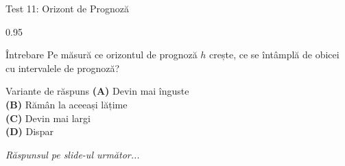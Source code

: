 \documentclass[9pt, aspectratio=169, t]{beamer}
\begin{document}
\begin{frame}{Test 11: Orizont de Prognoză}
    \begin{cminipage}{0.95\textwidth}
    \begin{alertblock}{Întrebare}
        Pe măsură ce orizontul de prognoză $h$ crește, ce se întâmplă de obicei cu intervalele de prognoză?
    \end{alertblock}

    \vspace{0.4cm}

    \begin{block}{Variante de răspuns}
    \textcolor{MainBlue}{\textbf{(A)}} Devin mai înguste\\[3pt]
    \textcolor{MainBlue}{\textbf{(B)}} Rămân la aceeași lățime\\[3pt]
    \textcolor{MainBlue}{\textbf{(C)}} Devin mai largi\\[3pt]
    \textcolor{MainBlue}{\textbf{(D)}} Dispar
    \end{block}
    \vspace{0.5cm}

    \begin{center}
        \textit{Răspunsul pe slide-ul următor...}
    \end{center}
    \end{cminipage}
\end{frame}
\end{document}
